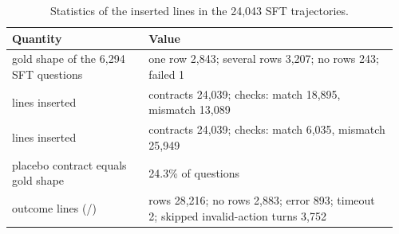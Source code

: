 \begin{table}[t]
\centering\small
{\setlength{\tabcolsep}{3.5pt}%
\begin{tabular}{@{}p{0.34\linewidth}p{0.62\linewidth}@{}}
\toprule
Quantity & Value \\
\midrule
gold shape of the 6,294 SFT questions & one row 2,843; several rows 3,207; no rows 243; failed 1 \\
\armG{} lines inserted & contracts 24,039; checks: match 18,895, mismatch 13,089 \\
\armGp{} lines inserted & contracts 24,039; checks: match 6,035, mismatch 25,949 \\
placebo contract equals gold shape & 24.3\% of questions \\
outcome lines (\armE{}/\armF{}) & rows 28,216; no rows 2,883; error 893; timeout 2; skipped invalid-action turns 3,752 \\
\bottomrule
\end{tabular}}
\caption{Statistics of the inserted lines in the 24,043 SFT trajectories.}
\label{tab:construction}
\end{table}
